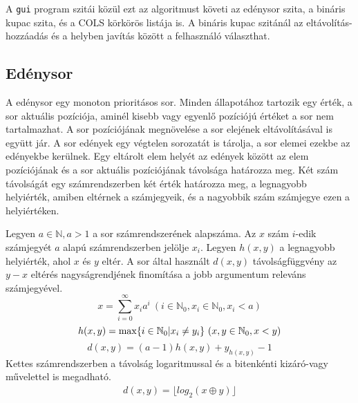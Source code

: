 A \texttt{gui} program szitái közül ezt az algoritmust követi az edénysor szita, a bináris kupac szita, és a COLS körkörös listája is. A bináris kupac szitánál az eltávolítás-hozzáadás és a helyben javítás között a felhasználó választhat.

\subsection{Edénysor}

A edénysor egy monoton prioritásos sor.
Minden állapotához tartozik egy érték, a sor aktuális pozíciója, aminél kisebb vagy egyenlő pozíciójú értéket a sor nem tartalmazhat.
A sor pozíciójának megnövelése a sor elejének eltávolításával is együtt jár.
A sor edények egy végtelen sorozatát is tárolja, a sor elemei ezekbe az edényekbe kerülnek.
Egy eltárolt elem helyét az edények között az elem pozíciójának és a sor aktuális pozíciójának távolsága határozza meg.
Két szám távolságát egy számrendszerben két érték határozza meg, a legnagyobb helyiérték, amiben eltérnek a számjegyeik, és a nagyobbik szám számjegye ezen a helyiértéken.

Legyen $a \in \mathbb{N}, a > 1$ a sor számrendszerének alapszáma.
Az $x$ szám $i$-edik számjegyét $a$ alapú számrendszerben jelölje $x_i$.
Legyen $h(x, y)$ a legnagyobb helyiérték, ahol $x$ és $y$ eltér.
A sor által használt $d(x, y)$ távolságfüggvény az $y-x$ eltérés nagyságrendjének finomítása a jobb argumentum releváns számjegyével.
\begin{equation}
x = \sum_{i=0}^{\infty} x_i a^i\ (i \in \mathbb{N}_0, x_i \in \mathbb{N}_0, x_i < a)
\end{equation}
\begin{equation}
h(x, y) = \max \lbrace i \in \mathbb{N}_0 | x_i \not= y_i\rbrace \ (x, y \in \mathbb{N}_0, x<y)\\
\end{equation}
\begin{equation}
\label{ddef}
d(x, y) = (a-1) h(x, y) + y_{h(x, y)} - 1
\end{equation}
Kettes számrendszerben a távolság logaritmussal és a bitenkénti kizáró-vagy művelettel is megadható.
\begin{align*}
d(x, y) = \lfloor log_2{(x \oplus y)} \rfloor
\end{align*}

